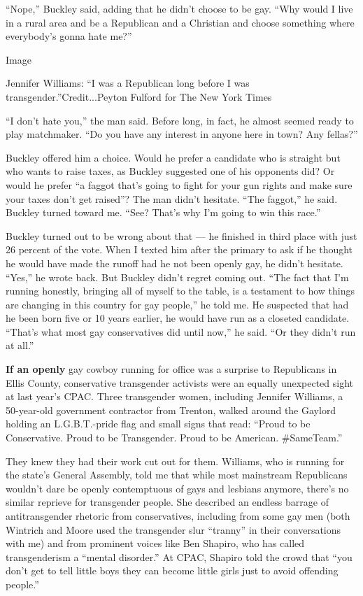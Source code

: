 ``Nope,'' Buckley said, adding that he didn't choose to be gay. ``Why
would I live in a rural area and be a Republican and a Christian and
choose something where everybody's gonna hate me?''

Image

Jennifer Williams: ``I was a Republican long before I was
transgender.''Credit...Peyton Fulford for The New York Times

``I don't hate you,'' the man said. Before long, in fact, he almost
seemed ready to play matchmaker. ``Do you have any interest in anyone
here in town? Any fellas?''

Buckley offered him a choice. Would he prefer a candidate who is
straight but who wants to raise taxes, as Buckley suggested one of his
opponents did? Or would he prefer ``a faggot that's going to fight for
your gun rights and make sure your taxes don't get raised''? The man
didn't hesitate. ``The faggot,'' he said. Buckley turned toward me.
``See? That's why I'm going to win this race.''

Buckley turned out to be wrong about that --- he finished in third place
with just 26 percent of the vote. When I texted him after the primary to
ask if he thought he would have made the runoff had he not been openly
gay, he didn't hesitate. ``Yes,'' he wrote back. But Buckley didn't
regret coming out. ``The fact that I'm running honestly, bringing all of
myself to the table, is a testament to how things are changing in this
country for gay people,'' he told me. He suspected that had he been born
five or 10 years earlier, he would have run as a closeted candidate.
``That's what most gay conservatives did until now,'' he said. ``Or they
didn't run at all.''

\textbf{If an openly} gay cowboy running for office was a surprise to
Republicans in Ellis County, conservative transgender activists were an
equally unexpected sight at last year's CPAC. Three transgender women,
including Jennifer Williams, a 50-year-old government contractor from
Trenton, walked around the Gaylord holding an L.G.B.T.-pride flag and
small signs that read: ``Proud to be Conservative. Proud to be
Transgender. Proud to be American. \#SameTeam.''

They knew they had their work cut out for them. Williams, who is running
for the state's General Assembly, told me that while most mainstream
Republicans wouldn't dare be openly contemptuous of gays and lesbians
anymore, there's no similar reprieve for transgender people. She
described an endless barrage of antitransgender rhetoric from
conservatives, including from some gay men (both Wintrich and Moore used
the transgender slur ``tranny'' in their conversations with me) and from
prominent voices like Ben Shapiro, who has called transgenderism a
``mental disorder.'' At CPAC, Shapiro told the crowd that ``you don't
get to tell little boys they can become little girls just to avoid
offending people.''

